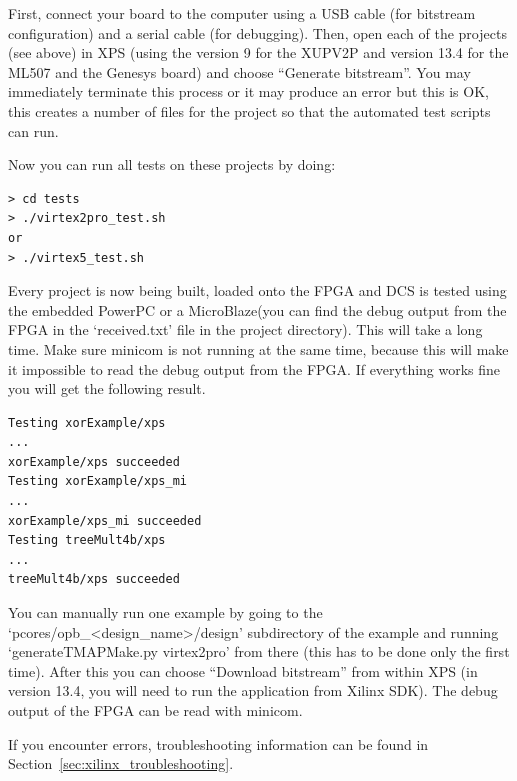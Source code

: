 \documentclass[a4paper,oneside]{memoir}
\begin{document}
First, connect your board to the computer using a USB cable (for bitstream configuration) and a serial cable (for debugging).
Then, open each of the projects (see above) in XPS (using the version 9 for the XUPV2P and version 13.4 for the ML507 and the Genesys board) and choose ``Generate bitstream''. You may immediately terminate this process or it may produce an error but this is OK, this creates a number of files for the project so that the automated test scripts can run.


Now you can run all tests on these projects by doing:
\begin{lstlisting}
> cd tests
> ./virtex2pro_test.sh
or
> ./virtex5_test.sh
\end{lstlisting}

Every project is now being built, loaded onto the FPGA and DCS is tested using the embedded PowerPC or a MicroBlaze(you can find the debug output from the FPGA in the `received.txt' file in the project directory). This will take a long time. Make sure minicom is not running at the same time, because this will make it impossible to read the debug output from the FPGA. If everything works fine you will get the following result. 

\begin{lstlisting}
Testing xorExample/xps
...
xorExample/xps succeeded
Testing xorExample/xps_mi
...
xorExample/xps_mi succeeded
Testing treeMult4b/xps
...
treeMult4b/xps succeeded
\end{lstlisting}

You can manually run one example by going to the `pcores/opb\_<design\_name>/design' subdirectory of the example and running `generateTMAPMake.py virtex2pro' from there (this has to be done only the first time). After this you can choose ``Download bitstream'' from within XPS (in version 13.4, you will need to run the application from Xilinx SDK).
The debug output of the FPGA can be read with minicom.

If you encounter errors, troubleshooting information can be found in Section~\ref{sec:xilinx_troubleshooting}.
\end{document}
